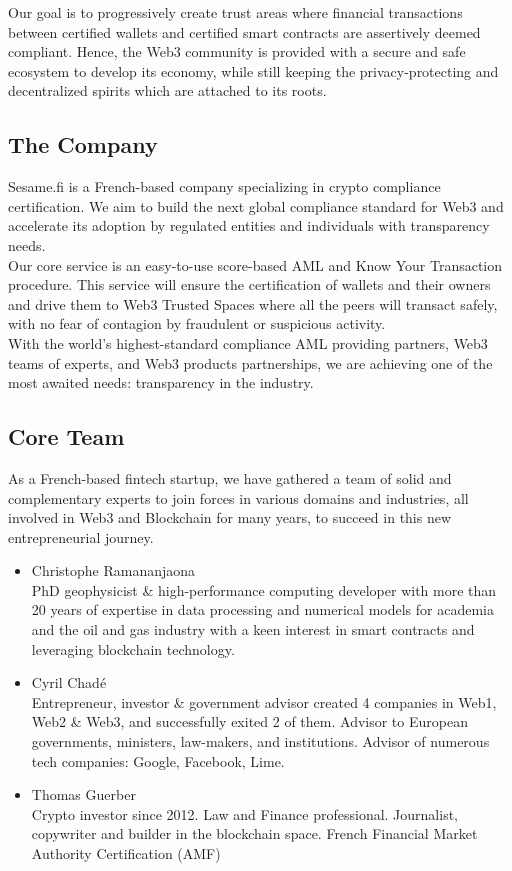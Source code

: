 ﻿\documentclass[a4paper]{article}
\newcommand{\smallvspace}{\vspace{4pt} \\}
\begin{document}
Our goal is to progressively create trust areas where financial transactions between certified wallets and certified smart contracts are assertively deemed compliant. Hence, the Web3 community is provided with a secure and safe ecosystem to develop its economy, while still keeping the privacy-protecting and decentralized spirits which are attached to its roots.

\subsection{The Company}
Sesame.fi is a French-based company specializing in crypto compliance certification. We aim to build the next global compliance standard for Web3 and accelerate its adoption by regulated entities and individuals with transparency needs. \\

Our core service is an easy-to-use score-based AML and Know Your Transaction procedure. This service will ensure the certification of wallets and their owners and drive them to Web3 Trusted Spaces where all the peers will transact safely, with no fear of contagion by fraudulent or suspicious activity. \\

With the world’s highest-standard compliance AML providing partners, Web3 teams of experts, and Web3 products partnerships, we are achieving one of the most awaited needs: transparency in the industry.
\subsection{Core Team}
As a French-based fintech startup, we have gathered a team of solid and complementary experts to join forces in various domains and industries, all involved in Web3 and Blockchain for many years, to succeed in this new entrepreneurial journey.

\begin{itemize}
\item 
Christophe Ramananjaona \smallvspace
PhD geophysicist \& high-performance computing developer with more than 20 years of expertise in data processing and numerical models for academia and the oil and gas industry with a keen interest in smart contracts and leveraging blockchain technology.

\item 
Cyril Chadé \smallvspace
Entrepreneur, investor \& government advisor created 4 companies in Web1, Web2 \& Web3, and successfully exited 2 of them. Advisor to European governments, ministers, law-makers, and institutions. Advisor of numerous tech companies: Google, Facebook, Lime. 

\item 
Thomas Guerber \smallvspace
Crypto investor since 2012. Law and Finance professional. Journalist, copywriter and builder in the blockchain space. French Financial Market Authority Certification (AMF)
\end{itemize}
\end{document}
